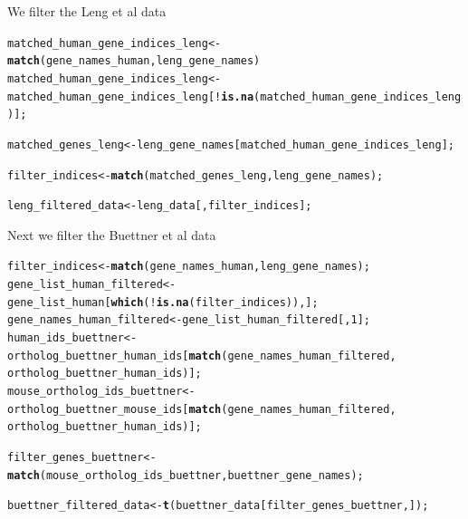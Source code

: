 \documentclass[12pt]{article}\usepackage[]{graphicx}\usepackage[usenames,dvipsnames]{color}
\makeatletter
\newcommand{\hlnum}[1]{\textcolor[rgb]{0.686,0.059,0.569}{#1}}%
\newcommand{\hlopt}[1]{\textcolor[rgb]{0,0,0}{#1}}%
\newcommand{\hlstd}[1]{\textcolor[rgb]{0.345,0.345,0.345}{#1}}%
\newcommand{\hlkwb}[1]{\textcolor[rgb]{0.69,0.353,0.396}{#1}}%
\newcommand{\hlkwd}[1]{\textcolor[rgb]{0.737,0.353,0.396}{\textbf{#1}}}%
\newenvironment{kframe}{%
 \def\at@end@of@kframe{}%
 \ifinner\ifhmode%
  \def\at@end@of@kframe{\end{minipage}}%
  \begin{minipage}{\columnwidth}%
 \fi\fi%
 \def\FrameCommand##1{\hskip\@totalleftmargin \hskip-\fboxsep
 \colorbox{shadecolor}{##1}\hskip-\fboxsep
     \hskip-\linewidth \hskip-\@totalleftmargin \hskip\columnwidth}%
 \MakeFramed {\advance\hsize-\width
   \@totalleftmargin\z@ \linewidth\hsize
   \@setminipage}}%
 {\par\unskip\endMakeFramed%
 \at@end@of@kframe}
\newenvironment{knitrout}{}{} %
\makeatother
\begin{document}
We filter the Leng et al data

\begin{knitrout}
\color{fgcolor}\begin{kframe}
\begin{alltt}
\hlstd{matched_human_gene_indices_leng} \hlkwb{<-} \hlkwd{match}\hlstd{(gene_names_human, leng_gene_names)}
\hlstd{matched_human_gene_indices_leng} \hlkwb{<-}
  \hlstd{matched_human_gene_indices_leng[}\hlopt{!}\hlkwd{is.na}\hlstd{(matched_human_gene_indices_leng)];}


\hlstd{matched_genes_leng} \hlkwb{<-} \hlstd{leng_gene_names[matched_human_gene_indices_leng];}

\hlstd{filter_indices} \hlkwb{<-} \hlkwd{match}\hlstd{(matched_genes_leng, leng_gene_names);}

\hlstd{leng_filtered_data} \hlkwb{<-} \hlstd{leng_data[,filter_indices];}
\end{alltt}
\end{kframe}
\end{knitrout}

Next we filter the Buettner et al data

\begin{knitrout}
\color{fgcolor}\begin{kframe}
\begin{alltt}
\hlstd{filter_indices} \hlkwb{<-} \hlkwd{match}\hlstd{(gene_names_human, leng_gene_names);}
\hlstd{gene_list_human_filtered} \hlkwb{<-} \hlstd{gene_list_human[}\hlkwd{which}\hlstd{(}\hlopt{!}\hlkwd{is.na}\hlstd{(filter_indices)),];}
\hlstd{gene_names_human_filtered} \hlkwb{<-} \hlstd{gene_list_human_filtered[,}\hlnum{1}\hlstd{];}
\hlstd{human_ids_buettner} \hlkwb{<-}
  \hlstd{ortholog_buettner_human_ids[}\hlkwd{match}\hlstd{(gene_names_human_filtered,}
                                    \hlstd{ortholog_buettner_human_ids)];}
\hlstd{mouse_ortholog_ids_buettner} \hlkwb{<-}
  \hlstd{ortholog_buettner_mouse_ids[}\hlkwd{match}\hlstd{(gene_names_human_filtered,}
                                    \hlstd{ortholog_buettner_human_ids)];}

\hlstd{filter_genes_buettner} \hlkwb{<-} \hlkwd{match}\hlstd{(mouse_ortholog_ids_buettner, buettner_gene_names);}

\hlstd{buettner_filtered_data} \hlkwb{<-} \hlkwd{t}\hlstd{(buettner_data[filter_genes_buettner,]);}
\end{alltt}
\end{kframe}
\end{knitrout}
\end{document}
